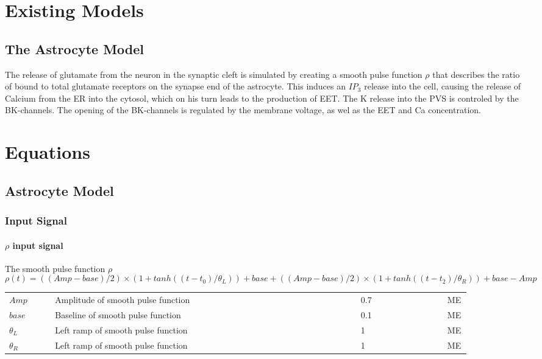 
\section{Existing Models}
\subsection{The Astrocyte Model}

The release of glutamate from the neuron in the synaptic cleft is simulated by creating a smooth pulse function $\rho$ that describes the ratio of bound to total glutamate receptors on the synapse end of the astrocyte. This induces an $IP_3$ release into the cell, causing the release of Calcium from the \gls{ER} into the cytosol, which on his turn leads to the production of EET. The \gls{K} release into the \gls{PVS} is controled by the BK-channels. The opening of the BK-channels is regulated by the membrane voltage, as wel as the EET and \gls{Ca} concentration.

\section{Equations}
\subsection{Astrocyte Model}
\subsubsection{Input Signal}
\paragraph{$\rho$ input signal}
The smooth pulse function $\rho$
\begin{equation}
\rho(t) = ((Amp - base)/2)\times(1+tanh((t-t_0)/\theta_L))+base+((Amp-base)/2)\times(1+tanh((t-t_2)/\theta_R))+base-Amp                     
\end{equation}
%
\begin{table}[h!]
	\centering
	\begin{tabular}{| p{0.09\linewidth} | >{\footnotesize} p{0.6\linewidth} | >{\footnotesize} p{0.17\linewidth} | >{\footnotesize} p{0.02\linewidth} |}
		\arrayrulecolor{lightgrey}\hline
		$Amp$           & Amplitude of smooth pulse function & 0.7 & ME\\
		$base$          & Baseline of smooth pulse function & 0.1 & ME\\
		$\theta_L$      & Left ramp of smooth pulse function & 1 & ME\\
		$\theta_R$      & Left ramp of smooth pulse function & 1 & ME\\
		\hline
	\end{tabular}
\end{table}

